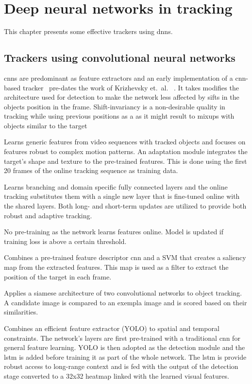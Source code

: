 \section{Deep neural networks in tracking}

This chapter presents some effective trackers using \ac{dnn}s.

\subsection{Trackers using convolutional neural networks}

\ac{cnn}s are predominant as feature extractors and an early implementation of a
\ac{cnn}-based tracker~\cite{HUMAN_CNN} pre-dates the work of Krizhevsky et.~al.
~\cite{NIPS_IMAGENET}. It takes modifies the architecture used for detection to
make the network less affected by sifts in the objects position in the frame.
Shift-invariancy is a non-desirable quality in tracking while using previous
positions as a as it might result to mixups with objects similar to the target
~\cite{HUMAN_CNN}

\cite{LEARNED_HIERARCH}
Learns generic features from video sequences with tracked objects and focuses on
features robust to complex motion patterns. An adaptation module integrates the
target's shape and texture to the pre-trained features. This is done using the
first 20 frames of the online tracking sequence as training data.

\cite{MULTI_DOMAIN}
Learns branching and domain specific fully connected layers and the online tracking
substitutes them with a single new layer that is fine-tuned online with the shared
layers. Both long- and short-term updates are utilized to provide both robust and
adaptive tracking.

\cite{DEEPTRACK}
No pre-training as the network learns features online. Model is updated if training
loss is above a certain threshold.

\cite{DISCR_SALIENCY}
Combines a pre-trained feature descriptor \ac{cnn} and a SVM that creates a
saliency map from the extracted features. This map is used as a filter to extract
the position of the target in each frame.

\cite{SIAM_TRACK}
Applies a siamese architecture of two convolutional networks to object tracking.
A candidate image is compared to an exempla image and is scored based on their
similarities.

\cite{SPAT_RCN}
Combines an efficient feature extractor (YOLO) to spatial and temporal constraints.
The network's layers are first pre-trained with a traditional \ac{cnn} for general
feature learning. YOLO is then adopted as the detection module and the \ac{lstm}
is added before training it as part of the whole network. The \ac{lstm} is provide
robust access to long-range context and is fed with the output of the detection
stage converted to a 32x32 heatmap linked with the learned visual features.

